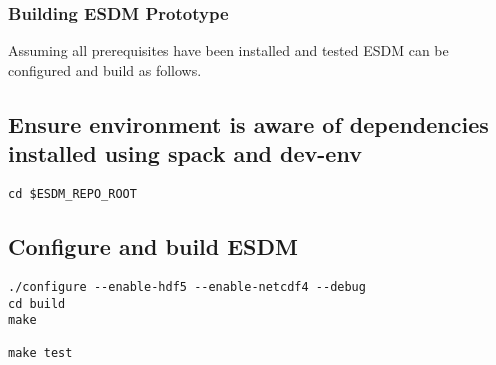 \subsubsection{Building ESDM Prototype}%
\label{building-esdm-prototype}

Assuming all prerequisites have been installed and tested ESDM can be
configured and build as follows.

\subsection{Ensure environment is aware of dependencies installed using spack and dev-env}%
\label{ensure-environment-is-aware-of-dependencies-installed-using-spack-and-dev-env-2}

\begin{lstlisting}
cd $ESDM_REPO_ROOT
\end{lstlisting}

\subsection{Configure and build ESDM}%
\label{configure-and-build-esdm}

\begin{lstlisting}
./configure --enable-hdf5 --enable-netcdf4 --debug
cd build
make

make test
\end{lstlisting}
